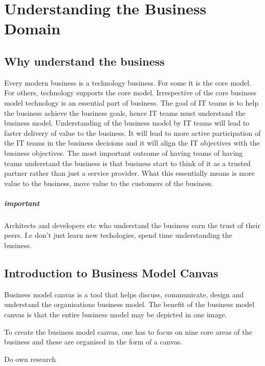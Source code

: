 \chapter{Understanding the Business Domain}


\section{Why understand the business}
Every modern business is a technology business. For some it is the core model. For others, technology supports the core model.
Irrespective of the core business model technology is an essential part of business.
The goal of IT teams is to help the business achieve the business goals, hence IT teams must understand the business model.
Understanding of the business model by IT teams will lead to faster delivery of value to the business.
It will lead to more active participation of the IT teams in the business decisions and it will align the IT objectives with the business objectives.
The most important outcome of having teams of having teams understand the business is that business start to think of it as a trusted partner rather than just a service provider.
What this essentially means is more value to the business, move value to the customers of the business.

\paragraph{important}
Architects and developers etc who understand the business earn the trust of their peers.
I.e don't just learn new techologies, spend time understanding the business.


\section{Introduction to Business Model Canvas}
Business model canvas is a tool that helps discuss, communicate, design and understand the organisations business model.
The benefit of the business model canvas is that the entire business model may be depicted in one image.

To create the business model canvas, one has to focus on nine core areas of the business and these are organised in the form of a canvas.

Do own research

